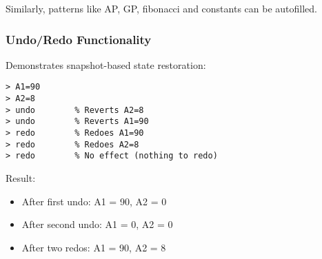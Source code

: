 Similarly, patterns like AP, GP, fibonacci and constants can be autofilled.

\subsubsection*{Undo/Redo Functionality }
Demonstrates snapshot-based state restoration:
\begin{verbatim}
> A1=90
> A2=8
> undo        % Reverts A2=8
> undo        % Reverts A1=90
> redo        % Redoes A1=90
> redo        % Redoes A2=8
> redo        % No effect (nothing to redo)
\end{verbatim}
    Result:
\begin{itemize}
    \item After first undo: A1 = 90, A2 = 0
    \item After second undo: A1 = 0, A2 = 0
    \item After two redos: A1 = 90, A2 = 8
\end{itemize}


